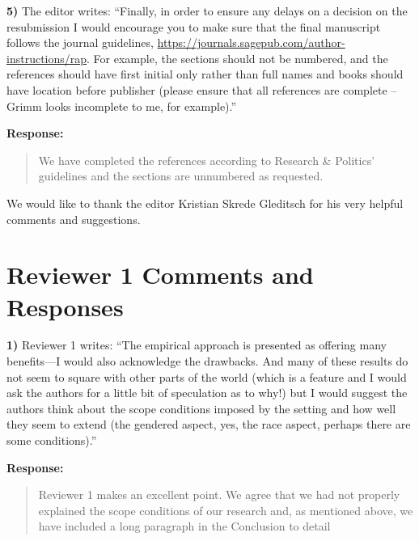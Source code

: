 \documentclass[a4paper,12pt]{article}
\begin{document}
\vspace{.3cm}

\noindent \textbf{5)} The editor writes: ``Finally, in order to ensure any
delays on a decision on the resubmission I would encourage you to make sure
that the final manuscript follows the journal guidelines,
\url{https://journals.sagepub.com/author-instructions/rap}. For example, the
sections should not be numbered, and the references should have first initial
only rather than full names and books should have location before publisher
(please ensure that all references are complete – Grimm looks incomplete to me,
for example).''

\noindent \textbf{Response:} 
\begin{quote}

We have completed the references according to Research \& Politics' guidelines
and the sections are unnumbered as requested.

\end{quote}

\vspace{.3cm}

We would like to thank the editor Kristian Skrede Gleditsch for his very
helpful comments and suggestions.

\section*{Reviewer 1 Comments and Responses}

\noindent \textbf{1)} Reviewer 1 writes: ``The empirical approach is presented
as offering many benefits---I would also acknowledge the drawbacks. And many of
these results do not seem to square with other parts of the world (which is a
feature and I would ask the authors for a little bit of speculation as to why!)
but I would suggest the authors think about the scope conditions imposed by the
setting and how well they seem to extend (the gendered aspect, yes, the race
aspect, perhaps there are some conditions).''

\vspace{.3cm}

\noindent \textbf{Response:} \begin{quote}
  
Reviewer 1 makes an excellent point. We agree that we had not properly
explained the scope conditions of our research and, as mentioned above, we have
included a long paragraph in the Conclusion to detail 

\end{quote}
\end{document}

